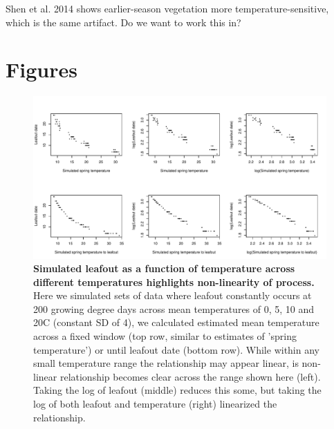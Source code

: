 \documentclass[11pt,letter]{article}
\begin{document}
Shen et al. 2014 shows earlier-season vegetation more temperature-sensitive, which is the same artifact. Do we want to work this in?

\section* {Figures}

\begin{figure}[h!]
\centering
\noindent \includegraphics[width=1\textwidth]{..//analyses/figures/simslogging.pdf}
\caption{\textbf{Simulated leafout as a function of temperature across different temperatures highlights non-linearity of process.} Here we simulated sets of data where leafout constantly occurs at 200 growing degree days across mean temperatures of 0, 5, 10 and 20C (constant SD of 4), we calculated estimated mean temperature across a fixed window (top row, similar to estimates of 'spring temperature') or until leafout date (bottom row). While within any small temperature range the relationship may appear linear, is non-linear relationship becomes clear across the range shown here (left). Taking the log of leafout (middle) reduces this some, but taking the log of both leafout and temperature (right) linearized the relationship.}
\label{fig:simslog} %
\end{figure}
\end{document}
